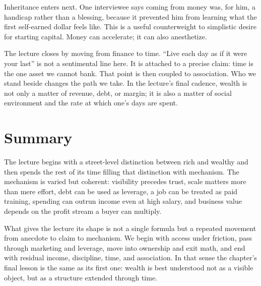 Inheritance enters next. One interviewee says coming from money was, for him, a handicap rather than a blessing, because it prevented him from learning what the first self-earned dollar feels like. This is a useful counterweight to simplistic desire for starting capital. Money can accelerate; it can also anesthetize.

The lecture closes by moving from finance to time. ``Live each day as if it were your last'' is not a sentimental line here. It is attached to a precise claim: time is the one asset we cannot bank. That point is then coupled to association. Who we stand beside changes the path we take. In the lecture's final cadence, wealth is not only a matter of revenue, debt, or margin; it is also a matter of social environment and the rate at which one's days are spent.

\section{Summary}

The lecture begins with a street-level distinction between rich and wealthy and then spends the rest of its time filling that distinction with mechanism. The mechanism is varied but coherent: visibility precedes trust, scale matters more than mere effort, debt can be used as leverage, a job can be treated as paid training, spending can outrun income even at high salary, and business value depends on the profit stream a buyer can multiply.

What gives the lecture its shape is not a single formula but a repeated movement from anecdote to claim to mechanism. We begin with access under friction, pass through marketing and leverage, move into ownership and exit math, and end with residual income, discipline, time, and association. In that sense the chapter's final lesson is the same as its first one: wealth is best understood not as a visible object, but as a structure extended through time.